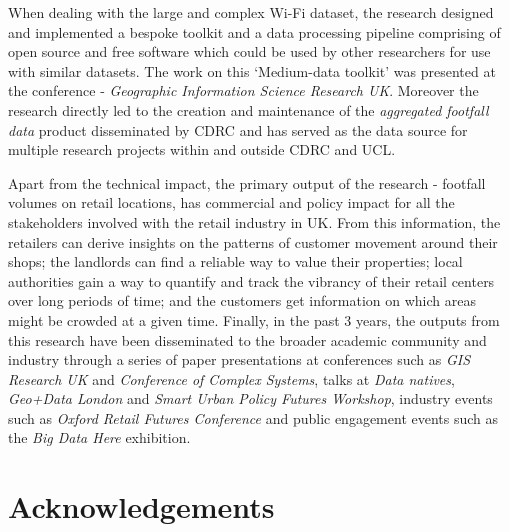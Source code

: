 When dealing with the large and complex Wi-Fi dataset, the research designed and implemented a bespoke toolkit and a data processing pipeline comprising of open source and free software which could be used by other researchers for use with similar datasets.
The work on this `Medium-data toolkit' was presented at the conference - \textit{Geographic Information Science Research UK}.
Moreover the research directly led to the creation and maintenance of the \textit{aggregated footfall data} product disseminated by CDRC  and has served as the data source for multiple research projects within and outside CDRC and UCL.

Apart from the technical impact, the primary output of the research - footfall volumes on retail locations, has commercial and policy impact for all the stakeholders involved with the retail industry in UK. 
From this information, the retailers can derive insights on the patterns of customer movement around their shops; the landlords can find a reliable way to value their properties; local authorities gain a way to quantify and track the vibrancy of their retail centers over long periods of time; and the customers get information on which areas might be crowded at a given time.
Finally, in the past 3 years, the outputs from this research have been disseminated to the broader academic community and industry through a series of paper presentations at conferences such as \textit{GIS Research UK} and \textit{Conference of Complex Systems}, talks at \textit{Data natives}, \textit{Geo+Data London} and \textit{Smart Urban Policy Futures Workshop}, industry events such as \textit{Oxford Retail Futures Conference} and public engagement events such as the \textit{Big Data Here} exhibition.

\pagebreak

\section*{Acknowledgements} 

